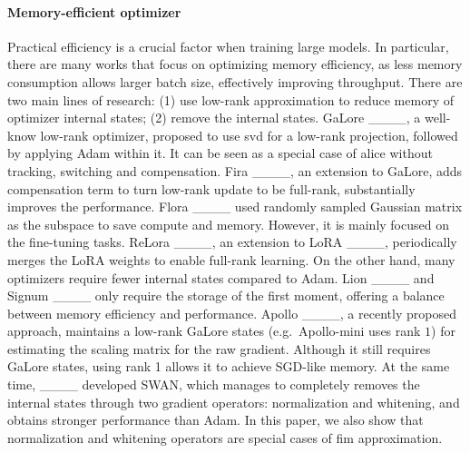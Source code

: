 \paragraph{Memory-efficient optimizer}
Practical efficiency is a crucial factor when training large models. In particular, there are many works that focus on optimizing memory efficiency, as less memory consumption allows larger batch size, effectively improving throughput.
There are two main lines of research: (1) use low-rank approximation to reduce memory of optimizer internal states; (2) remove the internal states.
GaLore ____, a well-know low-rank optimizer, proposed to use \gls{svd} for a low-rank projection, followed by applying Adam within it. It can be seen as a special case of \gls{alice} without tracking, switching and compensation.
Fira ____, an extension to GaLore, adds compensation term to turn low-rank update to be full-rank, substantially improves the performance. Flora ____ used randomly sampled Gaussian matrix as the subspace to save compute and memory. However, it is mainly focused on the fine-tuning tasks. ReLora ____, an extension to LoRA ____, periodically merges the LoRA weights to enable full-rank learning. 
On the other hand, many optimizers require fewer internal states compared to Adam. Lion ____ and Signum ____ only require the storage of the first moment, offering a balance between memory efficiency and performance. Apollo ____, a recently proposed approach, maintains a low-rank GaLore states (e.g.~Apollo-mini uses rank $1$) for estimating the scaling matrix for the raw gradient. Although it still requires GaLore states, using rank 1 allows it to achieve SGD-like memory. At the same time, ____ developed SWAN, which manages to completely removes the internal states through two gradient operators: normalization and whitening, and obtains stronger performance than Adam. In this paper, we also show that normalization and whitening operators are special cases of \gls{fim} approximation.